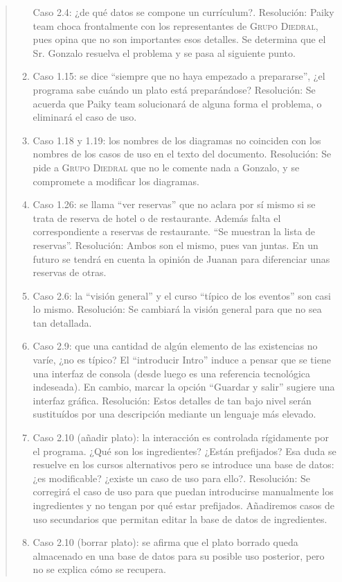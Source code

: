 \documentclass[11pt, a4paper, twoside]{report}
\begin{document}
\begin{quotation}
\begin{enumerate}
			Caso 2.4: ¿de qué datos se compone un currículum?.
			Resolución: Paiky team choca frontalmente con los representantes de \textsc{Grupo Diedral}, pues opina que no son importantes esos detalles. Se determina que el Sr. Gonzalo resuelva el problema y se pasa al siguiente punto.
				\item Caso 1.15: se dice ``siempre que no haya empezado a prepararse'', ¿el programa sabe cuándo un plato está preparándose?
			Resolución: Se acuerda que Paiky team solucionará de alguna forma el problema, o eliminará el caso de uso.
				\item Caso 1.18 y 1.19: los nombres de los diagramas no coinciden con los nombres de los casos de uso en el texto del documento.
			Resolución: Se pide a  \textsc{Grupo Diedral} que no le comente nada a Gonzalo, y se compromete a modificar los diagramas.
				\item Caso 1.26: se llama ``ver reservas'' que no aclara por sí mismo si se trata de reserva de hotel o de restaurante. Además falta el correspondiente a reservas de restaurante. ``Se muestran la lista de reservas''.
			Resolución: Ambos son el  mismo, pues van juntas. En un futuro se tendrá en cuenta la opinión de Juanan para diferenciar unas reservas de otras.
				\item Caso 2.6: la ``visión general'' y el curso ``típico de los eventos'' son casi lo mismo.
			Resolución: Se cambiará la visión general para que no sea tan detallada.
				\item Caso 2.9: que una cantidad de algún elemento de las existencias no varíe, ¿no es típico? El ``introducir Intro'' induce a pensar que se tiene una interfaz de consola (desde luego es una referencia tecnológica indeseada).
			En cambio, marcar la opción ``Guardar y salir'' sugiere una interfaz gráfica.
			Resolución: Estos detalles de tan bajo nivel serán sustituídos por una descripción mediante un lenguaje más elevado.
				\item Caso 2.10 (añadir plato): la interacción es controlada rígidamente por el programa. ¿Qué son los ingredientes? ¿Están prefijados? Esa duda se resuelve en los cursos alternativos pero se introduce una base de datos: ¿es modificable? 					¿existe un caso de uso para ello?.
			Resolución: Se corregirá el caso de uso para que puedan introducirse manualmente los ingredientes y no tengan por qué estar prefijados. Añadiremos casos de uso secundarios que permitan editar la base de datos de ingredientes.
				\item Caso 2.10 (borrar plato): se afirma que el plato borrado queda almacenado en una base de datos para su posible uso posterior, pero no se explica cómo se recupera.

\end{enumerate}
\end{quotation}
\end{document}
